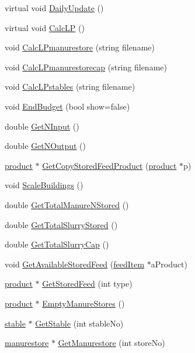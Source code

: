 \begin{DoxyCompactItemize}
\item 
virtual void \hyperlink{classbuildings_a087a7412a9998a4bf7be6225bc38bb5c}{DailyUpdate} ()
\item 
virtual void \hyperlink{classbuildings_a23440e08dbfc88ebfa39a3e097f6c366}{CalcLP} ()
\item 
void \hyperlink{classbuildings_acd04fcf6f4eefce96875603c5d283dd4}{CalcLPmanurestore} (string filename)
\item 
void \hyperlink{classbuildings_ae61dd92b601d41c4b3d41dfc3aa28238}{CalcLPmanurestorecap} (string filename)
\item 
void \hyperlink{classbuildings_ad0c0772d201264de61f3d255850fac73}{CalcLPstables} (string filename)
\item 
void \hyperlink{classbuildings_a91354eb25a6b4b817034883ea0f824c3}{EndBudget} (bool show=false)
\item 
double \hyperlink{classbuildings_a8b590b3f7488bb7b95dcf936e54769da}{GetNInput} ()
\item 
double \hyperlink{classbuildings_a48d4b22d3d794acd230f9394047e4165}{GetNOutput} ()
\item 
\hyperlink{classproduct}{product} $\ast$ \hyperlink{classbuildings_adea0a6434b66c56d04a52fad0b9b2979}{GetCopyStoredFeedProduct} (\hyperlink{classproduct}{product} $\ast$p)
\item 
void \hyperlink{classbuildings_a4801905be37d8b7a0ea0487879a79cc3}{ScaleBuildings} ()
\item 
double \hyperlink{classbuildings_a07a1880ab85c57d783b1fc5582e767de}{GetTotalManureNStored} ()
\item 
double \hyperlink{classbuildings_a02b582aacb2a1b00464c501a3a5635ff}{GetTotalSlurryStored} ()
\item 
double \hyperlink{classbuildings_a01997e6fff4a33f76068f49dd064582f}{GetTotalSlurryCap} ()
\item 
void \hyperlink{classbuildings_ae8225491bee18bb4647149201b24d8ba}{GetAvailableStoredFeed} (\hyperlink{classfeed_item}{feedItem} $\ast$aProduct)
\item 
\hyperlink{classproduct}{product} $\ast$ \hyperlink{classbuildings_a9b71637ed71eb2f332c3f56d774f2f6a}{GetStoredFeed} (int type)
\item 
\hyperlink{classproduct}{product} $\ast$ \hyperlink{classbuildings_a0e445434af31aa7d49db660a67dcfa04}{EmptyManureStores} ()
\item 
\hyperlink{classstable}{stable} $\ast$ \hyperlink{classbuildings_af7822b1a537bbb71b55db60c2f48b07b}{GetStable} (int stableNo)
\item 
\hyperlink{classmanurestore}{manurestore} $\ast$ \hyperlink{classbuildings_aba1d7b741afc477fa08d0cdcdfed7e95}{GetManurestore} (int storeNo)
\end{DoxyCompactItemize}
